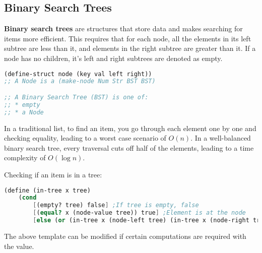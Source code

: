 \documentclass[english, 12pt]{article}
\begin{document}
\subsection{Binary Search Trees}
\begin{defn}
\textbf{Binary search trees} are structures that store data and makes searching for items more efficient. This requires that for each node, all the elements in its left subtree are less than it, and elements in the right subtree are greater than it. If a node has no children, it's left and right subtrees are denoted as empty.
\begin{lstlisting}[language=Scheme]
(define-struct node (key val left right))
;; A Node is a (make-node Num Str BST BST)

;; A Binary Search Tree (BST) is one of:
;; * empty
;; * a Node
\end{lstlisting}
\begin{asd}
In a traditional list, to find an item, you go through each element one by one and checking equality, leading to a worst case scenario of $O(n)$. In a well-balanced binary search tree, every traversal cuts off half of the elements, leading to a time complexity of $O (\log n)$.
\end{asd}
\end{defn}
\pagebreak
\begin{exmp}
Checking if an item is in a tree:
\begin{lstlisting}[language=Scheme]
(define (in-tree x tree)
	(cond 
		[(empty? tree) false] ;If tree is empty, false
		[(equal? x (node-value tree)) true] ;Element is at the node
		[else (or (in-tree x (node-left tree) (in-tree x (node-right tree))))])) ;; Checks both subtrees
\end{lstlisting}
\begin{note}
The above template can be modified if certain computations are required with the value.
\end{note}
\end{exmp}
\end{document}
